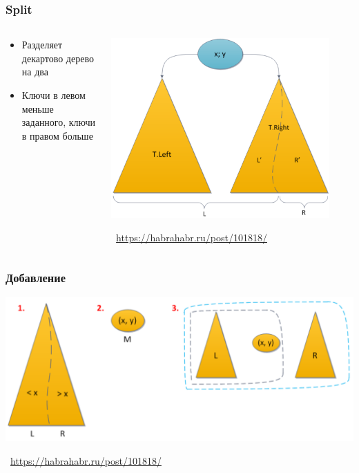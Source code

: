 \documentclass[xetex,mathserif,serif]{beamer}
\newcommand{\attribution}[1] {
	\begin{flushright}\begin{scriptsize}\textcolor{gray}{\textcopyright\, #1}\end{scriptsize}\end{flushright}
}
\begin{document}
	\begin{frame}
		\frametitle{Split}
		\begin{columns}
			\begin{column}{0.5\textwidth}
				\begin{itemize}
					\item Разделяет декартово дерево на два
					\item Ключи в левом меньше заданного, ключи в правом больше
				\end{itemize}
			\end{column}
			\begin{column}{0.5\textwidth}
				\includegraphics[width=0.9\textwidth]{treapSplit.png}
				\attribution{\url{https://habrahabr.ru/post/101818/}}
			\end{column}
		\end{columns}
	\end{frame}

	\begin{frame}
		\frametitle{Добавление}
		\begin{center}
			\includegraphics[width=\textwidth]{treapAddition.png}
		\end{center}
		\attribution{\url{https://habrahabr.ru/post/101818/}}
	\end{frame}
\end{document}
